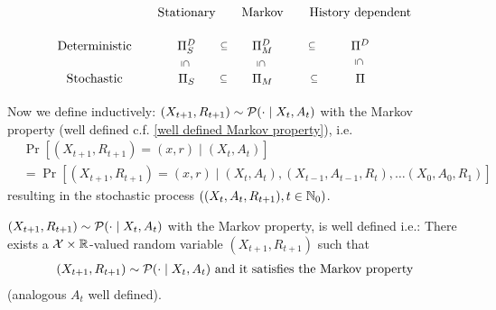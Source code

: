 \begin{definition}
\[\begin{tikzcd}[row sep = small, column sep = small]
		&\text{Stationary} & \text{Markov} & \text{History dependent}
		\\
		\text{Deterministic} 
		& \detPolicy
			\arrow[draw=none, shift right=2]{r}{\subseteq} 
			\ar[draw=none, shift right=2.7]{d}{\vsubseteq}
		& \Pi_M^D
			\arrow[draw=none, shift right=2]{r}{\subseteq} 
			\ar[draw=none, shift right=2.7]{d}{\vsubseteq}
		& \Pi^D
			\ar[draw=none, shift right=2.7]{d}{\vsubseteq}
		\\ 
		\text{Stochastic} 
		& \statPolicy 
			\arrow[draw=none, shift right=2]{r}{\subseteq} 
		& \Pi_M
			\arrow[draw=none, shift right=2]{r}{\subseteq}
		& \Pi
	\end{tikzcd}
	\]
\end{definition}

Now we define inductively: \((X_{t+1}, R_{t+1})\sim\mathcal{P}(\cdot\mid X_t, A_t)\) with the Markov property (well defined c.f. \ref{well defined Markov property}), i.e.
\begin{align}
\label{X,R Markov}
	&\Pr[(X_{t+1}, R_{t+1})=(x,r)\mid (X_t,A_t)]\\
	&=\Pr[(X_{t+1},R_{t+1})=(x,r) \mid (X_t,A_t),(X_{t-1},A_{t-1},R_t), 
	\dots (X_0,A_0,R_1)] \nonumber
\end{align}
resulting in the stochastic process \(((X_t,A_t,R_{t+1}), t\in \mathbb{N}_0)\).
\begin{remark}\label{well defined Markov property}
	\((X_{t+1}, R_{t+1})\sim\mathcal{P}(\cdot\mid X_t, A_t)\) with the Markov property, is well defined i.e.:
	There exists a \(\mathcal{X}\times\mathbb{R}\)-valued random variable \((X_{t+1}, R_{t+1})\)
	such that
	\begin{align*}
		(X_{t+1}, R_{t+1})\sim\mathcal{P}(\cdot\mid X_t, A_t) \text{ and it satisfies the Markov property}
	\end{align*}
	(analogous \(A_t\) well defined).
\end{remark}
